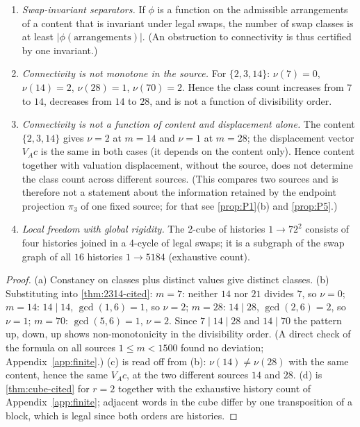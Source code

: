 \begin{proposition}\label{prop:P4}
\begin{enumerate}[label=(\alph*),itemsep=1pt]
\item \emph{Swap-invariant separators.} If $\phi$ is a function on the admissible arrangements of a content that is invariant under legal swaps, the number of swap classes is at least $|\phi(\text{arrangements})|$. (An obstruction to connectivity is thus certified by one invariant.)
\item \emph{Connectivity is not monotone in the source.} For $\{2,3,14\}$: $\nu(7)=0$, $\nu(14)=2$, $\nu(28)=1$, $\nu(70)=2$. Hence the class count increases from $7$ to $14$, decreases from $14$ to $28$, and is not a function of divisibility order.
\item \emph{Connectivity is not a function of content and displacement alone.} The content $\{2,3,14\}$ gives $\nu=2$ at $m=14$ and $\nu=1$ at $m=28$; the displacement vector $V_Ac$ is the same in both cases (it depends on the content only). Hence content together with valuation displacement, without the source, does not determine the class count across different sources. (This compares two sources and is therefore not a statement about the information retained by the endpoint projection $\pi_3$ of one fixed source; for that see \cref{prop:P1}(b) and \cref{prop:P5}.)
\item \emph{Local freedom with global rigidity.} The 2-cube of histories $1\to72^2$ consists of four histories joined in a 4-cycle of legal swaps; it is a subgraph of the swap graph of all $16$ histories $1\to5184$ (exhaustive count).
\end{enumerate}
\end{proposition}
\begin{proof}
(a) Constancy on classes plus distinct values give distinct classes. (b) Substituting into \cref{thm:2314-cited}: $m=7$: neither $14$ nor $21$ divides $7$, so $\nu=0$; $m=14$: $14\mid14$, $\gcd(1,6)=1$, so $\nu=2$; $m=28$: $14\mid28$, $\gcd(2,6)=2$, so $\nu=1$; $m=70$: $\gcd(5,6)=1$, $\nu=2$. Since $7\mid14\mid28$ and $14\mid70$ the pattern up, down, up shows non-monotonicity in the divisibility order. (A direct check of the formula on all sources $1\le m<1500$ found no deviation; Appendix~\ref{app:finite}.) (c) is read off from (b): $\nu(14)\ne\nu(28)$ with the same content, hence the same $V_Ac$, at the two different sources $14$ and $28$. (d) is \cref{thm:cube-cited} for $r=2$ together with the exhaustive history count of Appendix~\ref{app:finite}; adjacent words in the cube differ by one transposition of a block, which is legal since both orders are histories.
\end{proof}

